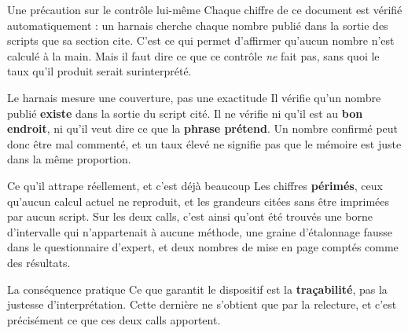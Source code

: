 \documentclass[11pt]{beamer}
\begin{document}
\begin{frame}{Une précaution sur le contrôle lui-même}
\scriptsize
Chaque chiffre de ce document est vérifié automatiquement : un harnais cherche chaque nombre
publié dans la sortie des scripts que sa section cite. C'est ce qui permet d'affirmer qu'aucun
nombre n'est calculé à la main. Mais il faut dire ce que ce contrôle \emph{ne} fait pas, sans
quoi le taux qu'il produit serait surinterprété.
\vspace{1.5mm}
\begin{block}{Le harnais mesure une couverture, pas une exactitude}
Il vérifie qu'un nombre publié \textbf{existe} dans la sortie du script cité. Il ne vérifie ni
qu'il est au \textbf{bon endroit}, ni qu'il veut dire ce que la \textbf{phrase prétend}. Un
nombre confirmé peut donc être mal commenté, et un taux élevé ne signifie pas que le mémoire est
juste dans la même proportion.
\end{block}
\vspace{-1.5mm}
\begin{block}{Ce qu'il attrape réellement, et c'est déjà beaucoup}
Les chiffres \textbf{périmés}, ceux qu'aucun calcul actuel ne reproduit, et les grandeurs citées
sans être imprimées par aucun script. Sur les deux calls, c'est ainsi qu'ont été trouvés une
borne d'intervalle qui n'appartenait à aucune méthode, une graine d'étalonnage fausse dans le
questionnaire d'expert, et deux nombres de mise en page comptés comme des résultats.
\end{block}
\vspace{-1.5mm}
\begin{block}{La conséquence pratique}
Ce que garantit le dispositif est la \textbf{traçabilité}, pas la justesse d'interprétation.
Cette dernière ne s'obtient que par la relecture, et c'est précisément ce que ces deux calls
apportent.
\end{block}
\end{frame}
\end{document}

